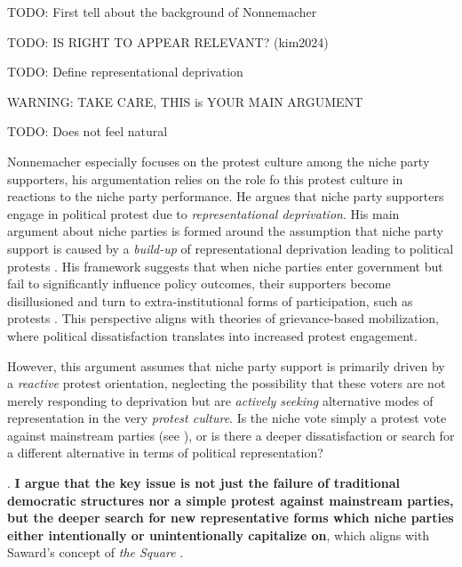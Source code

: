 \begin{commentenv}
	TODO: First tell about the background of Nonnemacher

	TODO: IS RIGHT TO APPEAR RELEVANT? (kim2024)

	TODO: Define representational deprivation

	WARNING: TAKE CARE, THIS is YOUR MAIN ARGUMENT

	TODO: Does not feel natural
\end{commentenv}

Nonnemacher \parencite*{nonnemacher2023} especially focuses on the protest
culture among the niche party supporters, his argumentation relies on the role
fo this protest culture in reactions to the niche party performance. He argues that niche party supporters engage in political protest due to \textit{representational deprivation}. His main argument about niche parties is formed around the assumption that niche party support is caused by a \textit{build-up} of representational deprivation leading to political protests \parencite[see 30]{nonnemacher2023}. His framework suggests that when niche parties enter government but fail to significantly influence policy outcomes, their supporters become disillusioned and turn to extra-institutional forms of participation, such as protests \parencite{nonnemacher2023}. This perspective aligns with theories of grievance-based mobilization, where political dissatisfaction translates into increased protest engagement.

However, this argument assumes that niche party support is primarily driven by a \textit{reactive} protest orientation, neglecting the possibility that these voters are not merely responding to deprivation but are \textit{actively seeking} alternative modes of representation in the very \emph{protest culture}. Is the niche vote simply a protest vote against mainstream parties (see \cite{hong2015, nonnemacher2023, stiers2024}), or is there a deeper dissatisfaction or search for a different alternative in terms of political representation?

.
\textbf{I argue that the key issue is not just the failure of traditional democratic structures nor a simple protest against mainstream parties, but the deeper search for new representative forms which niche parties either intentionally or unintentionally capitalize on}, which aligns with Saward’s concept of \textit{the Square} \parencite{saward2024}.

